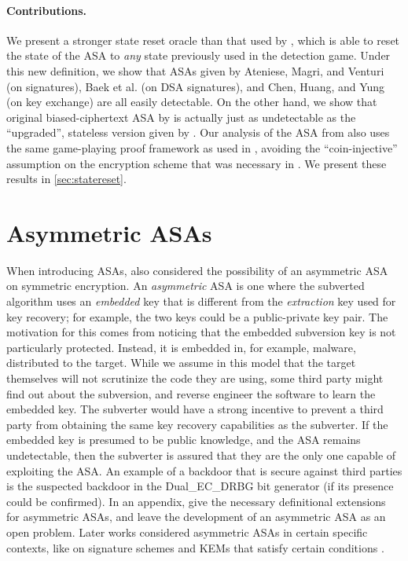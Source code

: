\paragraph{Contributions.}
We present a stronger state reset oracle than that used by \cite{BSKC2019}, which is able to reset the state of the ASA to \emph{any} state previously used in the detection game. Under this new definition, we show that ASAs given by Ateniese, Magri, and Venturi \cite{CCS:AteMagVen15} (on signatures), Baek et al. \cite{BSKC2019} (on DSA signatures), and Chen, Huang, and Yung \cite{AC:CheHuaYun20} (on key exchange) are all easily detectable. On the other hand, we show that original biased-ciphertext ASA by \cite{C:BelPatRog14} is actually just as undetectable as the ``upgraded'', stateless version given by \cite{CCS:BelJaeKan15}. Our analysis of the ASA from \cite{C:BelPatRog14} also uses the same game-playing proof framework as used in \cite{CCS:BelJaeKan15}, avoiding the ``coin-injective'' assumption on the encryption scheme that was necessary in \cite{C:BelPatRog14}. We present these results in \autoref{sec:statereset}.

\section{Asymmetric ASAs}
When introducing ASAs, \cite{C:BelPatRog14} also considered the possibility of an asymmetric ASA on symmetric encryption. An \emph{asymmetric} ASA is one where the subverted algorithm uses an \emph{embedded} key that is different from the \emph{extraction} key used for key recovery; for example, the two keys could be a public-private key pair. The motivation for this comes from noticing that the embedded subversion key is not particularly protected. Instead, it is embedded in, for example, malware, distributed to the target. While we assume in this model that the target themselves will not scrutinize the code they are using, some third party might find out about the subversion, and reverse engineer the software to learn the embedded key. The subverter would have a strong incentive to prevent a third party from obtaining the same key recovery capabilities as the subverter. If the embedded key is presumed to be public knowledge, and the ASA remains undetectable, then the subverter is assured that they are the only one capable of exploiting the ASA. An example of a backdoor that is secure against third parties is the suspected backdoor in the Dual\_EC\_DRBG bit generator \cite{SB1988} (if its presence could be confirmed). In an appendix, \cite{C:BelPatRog14} give the necessary definitional extensions for asymmetric ASAs, and leave the development of an asymmetric ASA as an open problem. Later works considered asymmetric ASAs in certain specific contexts, like on signature schemes and KEMs that satisfy certain conditions \cite{AC:CheHuaYun20,BSKC2019}.

